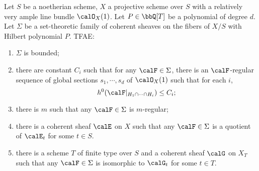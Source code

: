     \begin{theorem}\label{thm:Kleiman_criterion_for_boundness_of_coherent_sheaves}
        Let \(S\) be a noetherian scheme, \(X\) a projective scheme over \(S\) with a relatively very ample line bundle \(\calO_X(1)\).
        Let \(P \in \bbQ[T]\) be a polynomial of degree \(d\).
        Let \(\Sigma\) be a set-theoretic family of coherent sheaves on the fibers of \(X/S\) with Hilbert polynomial \(P\).
        TFAE:
        \begin{enumerate}
            \item \(\Sigma\) is bounded;
            \item there are constant \(C_i\) such that for any \(\calF \in \Sigma\), there is an \(\calF\)-regular sequence of global sections \(s_1,\cdots,s_d\) of \(\calO_X(1)\) such that for each \(i\),
                \[ h^0(\calF|_{H_1\cap \cdots \cap H_i}) \leq C_i; \]
            \item there is \(m\) such that any \(\calF \in \Sigma\) is \(m\)-regular;
            \item there is a coherent sheaf \(\calE\) on \(X\) such that any \(\calF \in \Sigma\) is a quotient of \(\calE_t\) for some \(t \in S\).
            \item there is a scheme \(T\) of finite type over \(S\) and a coherent sheaf \(\calG\) on \(X_T\) such that any \(\calF \in \Sigma\) is isomorphic to \(\calG_t\) for some \(t \in T\).
        \end{enumerate}
    \end{theorem}